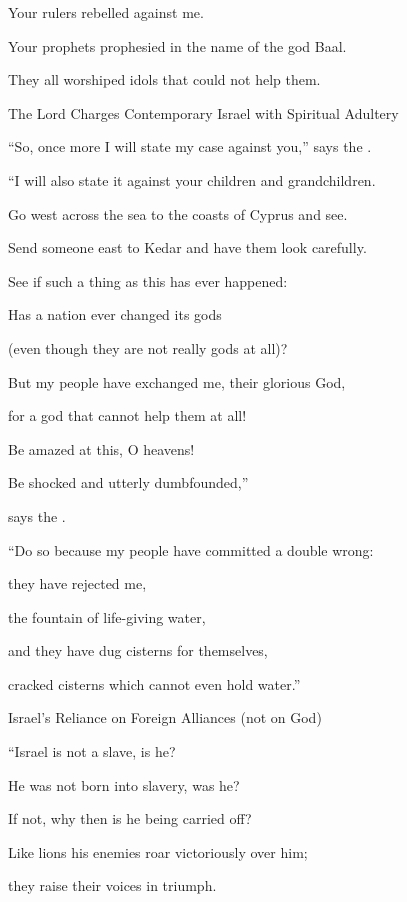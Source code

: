 {\par }{\Q Your rulers
rebelled against
me.
\par }{\Q Your prophets
prophesied
in the name of the god Baal.
\par }{\Q They all worshiped
idols that could not
help them.
\par }{\SH The Lord Charges Contemporary Israel with Spiritual Adultery
\par }{\Q {}“So,
once more
I will state
my case
against you,”
says
the {}.
\par }{\Q “I will also state
it against your children
and grandchildren.
\par }{\Q {}Go
west across
the sea to the coasts
of Cyprus
and see.
\par }{\Q Send
someone east to Kedar
and have them look carefully.
\par }{\Q See
if
such a thing as this has ever happened:
\par }{\Q {}Has a nation
ever changed
its gods
\par }{\Q (even though they
are not
really gods
at all)?
\par }{\Q But my people
have exchanged
me, their glorious
God,

\par }{\Q for a god
that cannot help them at all!
\par }{\Q {}Be amazed
at this,
O heavens!

\par }{\Q Be shocked
and utterly
dumbfounded,”
\par }{\Q says
the {}.
\par }{\Q {}“Do
so because
my people
have committed
a double
wrong:

\par }{\Q they have rejected
me,
\par }{\Q the fountain
of life-giving
water,
\par }{\Q and they have dug
cisterns
for themselves,
\par }{\Q cracked
cisterns
which
cannot
even hold
water.”
\par }{\SH Israel’s Reliance on Foreign Alliances (not on God)
\par }{\Q {}“Israel
is not a slave,
is he?
\par }{\Q He was not born
into slavery, was he?

\par }{\Q If not, why
then is he being
carried off?
\par }{\Q {}Like lions
his enemies roar
victoriously over
him;
\par }{\Q they raise
their voices
in triumph.

}
